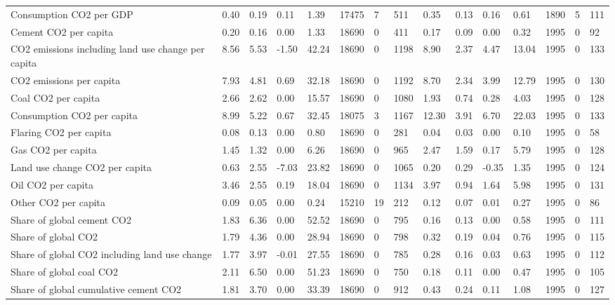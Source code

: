 \begin{longtable}{lllllllllllllll}
Consumption CO2 per GDP & 0.40 & 0.19 & 0.11 & 1.39 & 17475 & 7 & 511 & 0.35 & 0.13 & 0.16 & 0.61 & 1890 & 5 & 111\\
\addlinespace
Cement CO2 per capita & 0.20 & 0.16 & 0.00 & 1.33 & 18690 & 0 & 411 & 0.17 & 0.09 & 0.00 & 0.32 & 1995 & 0 & 92\\
CO2 emissions including land use change per capita & 8.56 & 5.53 & -1.50 & 42.24 & 18690 & 0 & 1198 & 8.90 & 2.37 & 4.47 & 13.04 & 1995 & 0 & 133\\
CO2 emissions per capita & 7.93 & 4.81 & 0.69 & 32.18 & 18690 & 0 & 1192 & 8.70 & 2.34 & 3.99 & 12.79 & 1995 & 0 & 130\\
Coal CO2 per capita & 2.66 & 2.62 & 0.00 & 15.57 & 18690 & 0 & 1080 & 1.93 & 0.74 & 0.28 & 4.03 & 1995 & 0 & 128\\
Consumption CO2 per capita & 8.99 & 5.22 & 0.67 & 32.45 & 18075 & 3 & 1167 & 12.30 & 3.91 & 6.70 & 22.03 & 1995 & 0 & 133\\
\addlinespace
Flaring CO2 per capita & 0.08 & 0.13 & 0.00 & 0.80 & 18690 & 0 & 281 & 0.04 & 0.03 & 0.00 & 0.10 & 1995 & 0 & 58\\
Gas CO2 per capita & 1.45 & 1.32 & 0.00 & 6.26 & 18690 & 0 & 965 & 2.47 & 1.59 & 0.17 & 5.79 & 1995 & 0 & 128\\
Land use change CO2 per capita & 0.63 & 2.55 & -7.03 & 23.82 & 18690 & 0 & 1065 & 0.20 & 0.29 & -0.35 & 1.35 & 1995 & 0 & 124\\
Oil CO2 per capita & 3.46 & 2.55 & 0.19 & 18.04 & 18690 & 0 & 1134 & 3.97 & 0.94 & 1.64 & 5.98 & 1995 & 0 & 131\\
Other CO2 per capita & 0.09 & 0.05 & 0.00 & 0.24 & 15210 & 19 & 212 & 0.12 & 0.07 & 0.01 & 0.27 & 1995 & 0 & 86\\
\addlinespace
Share of global cement CO2 & 1.83 & 6.36 & 0.00 & 52.52 & 18690 & 0 & 795 & 0.16 & 0.13 & 0.00 & 0.58 & 1995 & 0 & 111\\
Share of global CO2 & 1.79 & 4.36 & 0.00 & 28.94 & 18690 & 0 & 798 & 0.32 & 0.19 & 0.04 & 0.76 & 1995 & 0 & 115\\
Share of global CO2 including land use change & 1.77 & 3.97 & -0.01 & 27.55 & 18690 & 0 & 785 & 0.28 & 0.16 & 0.03 & 0.63 & 1995 & 0 & 112\\
Share of global coal CO2 & 2.11 & 6.50 & 0.00 & 51.23 & 18690 & 0 & 750 & 0.18 & 0.11 & 0.00 & 0.47 & 1995 & 0 & 105\\
Share of global cumulative cement CO2 & 1.81 & 3.70 & 0.00 & 33.39 & 18690 & 0 & 912 & 0.43 & 0.24 & 0.11 & 1.08 & 1995 & 0 & 127\\

\end{longtable}
